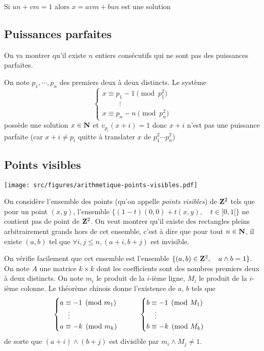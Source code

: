 \begin{rem}
    Si $un+vm=1$ alors $x=avm+bun$ est une solution
\end{rem}

\subsection{Puissances parfaites}

On va montrer qu'il existe $n$ entiers consécutifs qui ne sont pas des puissances parfaites.

On note $p_1, \cdots, p_n$ des premiers deux à deux distincts. Le système \[
    \begin{cases}
        x\equiv p_1-1\pmod {p_1^2}\\
        \hspace{1cm}\vdots\\
        x\equiv p_n-n\pmod{p_n^2}
    \end{cases}
\]
possède une solution $x\in\mathbf N$ et $v_{p_i}(x+i)=1$ donc $x+i$ n'est pas une puissance parfaite (car $x+i\neq p_i$ quitte à translater $x$ de $p_1^2\cdots p_n^2$)

\subsection{Points visibles}

\begin{center}
    \texttt{[image: src/figures/arithmetique-points-visibles.pdf]}
\end{center}

On considère l'ensemble des points (qu'on appelle \emph{points visibles}) de $\mathbf Z^2$ tels que pour un point $(x, y)$, l'ensemble $\{(1-t)(0, 0)+t(x, y), \quad t\in ]0, 1[\}$ ne contient pas de point de $\mathbf Z^2$. On veut montrer qu'il existe des rectangles pleins arbitrairement grands hors de cet ensemble, c'est à dire que pour tout $n\in\mathbf N$, il existe $(a, b)$ tel que $\forall i, j\leq n, (a+i, b+j)$ est invisible.

On vérifie facilement que cet ensemble est l'ensemble $\{(a, b)\in\mathbf Z^2, \quad a\land b=1\}$. On note $A$ une matrice $k\times k$ dont les coefficients sont des nombres premiers deux à deux distincts. On note $m_i$ le produit de la $i$-ième ligne, $M_i$ le produit de la $i$-ième colonne. Le théorème chinois donne l'existence de $a$, $b$ tels que \[
    \begin{cases}
        a\equiv -1\pmod {m_1} \\
        \hspace{.4cm}\vdots \\
        a\equiv -k\pmod{m_k}
    \end{cases}
    \qquad \begin{cases}
        b\equiv -1\pmod {M_1}\\
        \hspace{.4cm}\vdots \\
        b\equiv -k\pmod{M_k}
    \end{cases}
\]
de sorte que $(a+i)\land (b+j)$ est divisible par $m_i\land M_j\neq 1$.

